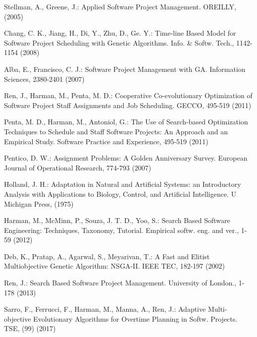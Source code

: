 

\begin{thebibliography}{}
%
Stellman, A., Greene, J.:
Applied Software Project Management.
OREILLY, (2005)

Chang, C. K., Jiang, H., Di, Y., Zhu, D., Ge. Y.:
Time-line Based Model for Software Project Scheduling with Genetic Algorithms.
Info. \& Softw. Tech., 1142-1154 (2008)

Alba, E., Francisco, C. J.:
Software Project Management with GA.
Information Sciences, 2380-2401 (2007)

Ren, J., Harman, M., Penta, M. D.:
Cooperative Co-evolutionary Optimization of Software 
Project Staff Assignments and Job Scheduling.
GECCO, 495-519 (2011)

Penta, M. D., Harman, M., Antoniol, G.:
The Use of Search-based Optimization Techniques to 
Schedule and Staff Software Projects: An Approach and an Empirical Study. 
Software Practice and Experience, 495-519 (2011)

Pentico, D. W.:
Assignment Problems: A Golden Anniversary Survey.
European Journal of Operational Research, 774-793 (2007)

Holland, J. H.:
Adaptation in Natural and Artificial Systems: an Introductory 
Analysis with Applications to Biology, Control, and Artificial Intelligence.
U Michigan Press, (1975)

Harman, M., McMinn, P., Souza, J. T. D., Yoo, S.:
Search Based Software Engineering: Techniques, Taxonomy, Tutorial.
Empirical softw. eng. and ver., 1-59 (2012)

Deb, K., Pratap, A., Agarwal, S., Meyarivan, T.:
A Fast and Elitist Multiobjective Genetic Algorithm: NSGA-II.
IEEE TEC, 182-197 (2002)

Ren, J.:
Search Based Software Project Management.
University of London., 1-178 (2013)

Sarro, F., Ferrucci, F., Harman, M., Manna, A., Ren, J.:
Adaptive Multi-objective Evolutionary Algorithms for Overtime Planning in Softw. Projects.
TSE, (99) (2017)


\end{thebibliography}
